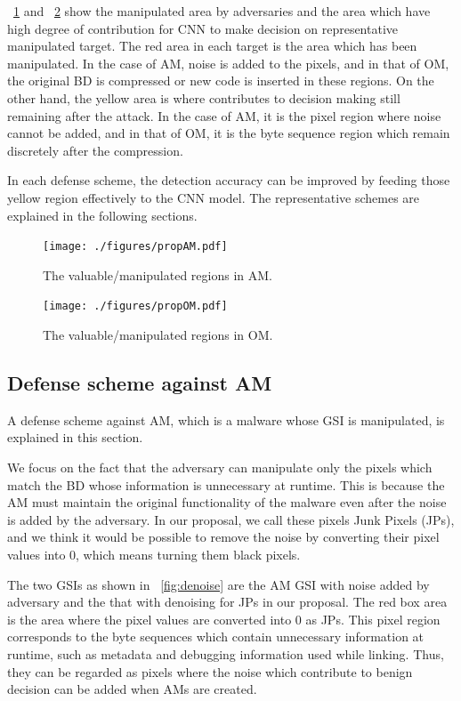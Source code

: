 \documentclass{ieeeaccess}
\begin{document}
\figurename~\ref{fig:propAM} and \figurename~\ref{fig:propOM} show the manipulated area by adversaries and the area which have high degree of contribution for CNN to make decision on representative manipulated target.
The red area in each target is the area which has been manipulated.
In the case of AM, noise is added to the pixels, and in that of OM, the original BD is compressed or new code is inserted in these regions.
On the other hand, the yellow area is where contributes to decision making still remaining after the attack.
In the case of AM, it is the pixel region where noise cannot be added, and in that of OM, it is the byte sequence region which remain discretely after the compression.

In each defense scheme, the detection accuracy can be improved by feeding those yellow region effectively to the CNN model.
The representative schemes are explained in the following sections.

\begin{figure}[h]
 \centering
 \texttt{[image: ./figures/propAM.pdf]}
 \caption{The valuable/manipulated regions in AM.} 
 \label{fig:propAM}
\end{figure}

\begin{figure}[h]
 \centering
 \texttt{[image: ./figures/propOM.pdf]}
 \caption{The valuable/manipulated regions in OM.} 
 \label{fig:propOM}
\end{figure}

\subsection{Defense scheme against AM}
A defense scheme against AM, which is a malware whose GSI is manipulated, is explained in this section.

We focus on the fact that the adversary can manipulate only the pixels which match the BD whose information is unnecessary at runtime.
This is because the AM must maintain the original functionality of the malware even after the noise is added by the adversary.
In our proposal, we call these pixels Junk Pixels (JPs), and we think it would be possible to remove the noise by converting their pixel values into 0, which means turning them black pixels.

The two GSIs as shown in \figurename~\ref{fig:denoise} are the AM GSI with noise added by adversary and the that with denoising for JPs in our proposal.
The red box area is the area where the pixel values are converted into 0 as JPs.
This pixel region corresponds to the byte sequences which contain unnecessary information at runtime, such as metadata and debugging information used while linking.
Thus, they can be regarded as pixels where the noise which contribute to benign decision can be added when AMs are created.
\end{document}
